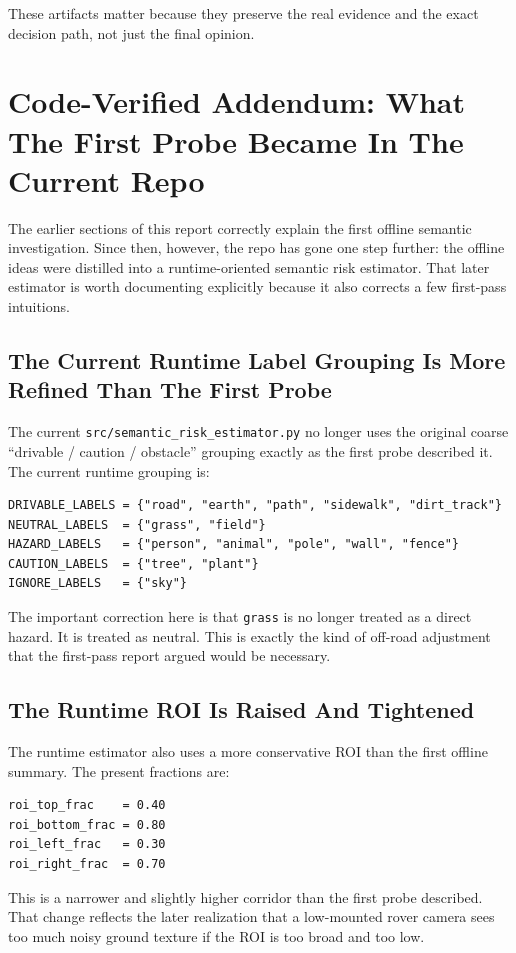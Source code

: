 \documentclass[11pt]{article}
\begin{document}
These artifacts matter because they preserve the real evidence and the exact decision path, not just the final opinion.


\section{Code-Verified Addendum: What The First Probe Became In The Current Repo}
The earlier sections of this report correctly explain the first offline semantic investigation. Since then, however, the repo has gone one step further: the offline ideas were distilled into a runtime-oriented semantic risk estimator. That later estimator is worth documenting explicitly because it also corrects a few first-pass intuitions.

\subsection{The Current Runtime Label Grouping Is More Refined Than The First Probe}
The current \texttt{src/semantic\_risk\_estimator.py} no longer uses the original coarse ``drivable / caution / obstacle'' grouping exactly as the first probe described it. The current runtime grouping is:
\begin{verbatim}
DRIVABLE_LABELS = {"road", "earth", "path", "sidewalk", "dirt_track"}
NEUTRAL_LABELS  = {"grass", "field"}
HAZARD_LABELS   = {"person", "animal", "pole", "wall", "fence"}
CAUTION_LABELS  = {"tree", "plant"}
IGNORE_LABELS   = {"sky"}
\end{verbatim}

The important correction here is that \texttt{grass} is no longer treated as a direct hazard. It is treated as neutral. This is exactly the kind of off-road adjustment that the first-pass report argued would be necessary.

\subsection{The Runtime ROI Is Raised And Tightened}
The runtime estimator also uses a more conservative ROI than the first offline summary. The present fractions are:
\begin{verbatim}
roi_top_frac    = 0.40
roi_bottom_frac = 0.80
roi_left_frac   = 0.30
roi_right_frac  = 0.70
\end{verbatim}

This is a narrower and slightly higher corridor than the first probe described. That change reflects the later realization that a low-mounted rover camera sees too much noisy ground texture if the ROI is too broad and too low.
\end{document}
